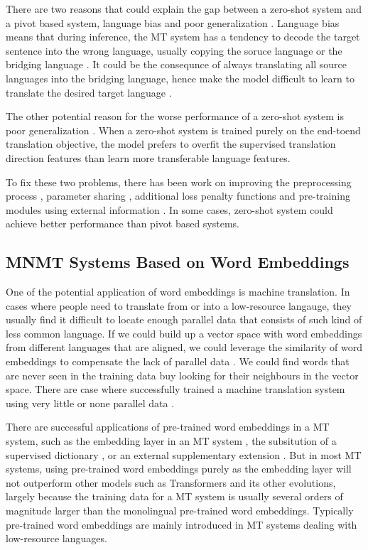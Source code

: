 \documentclass[thesis,fonts=libertine]{cluu}
\begin{document}
There are two reasons that could explain the gap between a zero-shot system and a pivot based system, language bias \parencite{Ha:2016aa,Ha:2017aa,Arivazhagan:2019aa} and poor generalization \parencite{Arivazhagan:2019aa}. Language bias means that during inference, the MT system has a tendency to decode the target sentence into the wrong language, usually copying the soruce language or the bridging language \cite{Ha:2016aa}. It could be the consequnce of always translating all source languages into the bridging language, hence make the model difficult to learn to translate the desired target language \parencite{Arivazhagan:2019aa}.

The other potential reason for the worse performance of a zero-shot system is poor generalization \parencite{Arivazhagan:2019aa}. When a zero-shot system is trained purely on the end-toend translation objective, the model prefers to overfit the supervised translation direction features than learn more transferable language features.

To fix these two problems, there has been work on improving the preprocessing process \parencite{Lakew:2018aa}, parameter sharing \parencite{Firat:2016aa, Blackwood:2018aa}, additional loss penalty functions \parencite{Arivazhagan:2019aa} and pre-training modules using external information \parencite{Baziotis:2020aa}. In some cases, zero-shot system could achieve better performance than pivot based systems.

\subsection{MNMT Systems Based on Word Embeddings}

One of the potential application of word embeddings is machine translation. In cases where people need to translate from or into a low-resource langauge, they usually find it difficult to locate enough parallel data that consists of such kind of less common language. If we could build up a vector space with word embeddings from different languages that are aligned, we could leverage the similarity of word embeddings to compensate the lack of parallel data \parencite{zou-etal-2013-bilingual}. We could find words that are never seen in the training data buy looking for their neighbours in the vector space. There are case where successfully trained a machine translation system using very little or none parallel data \parencite{Conneau:2017aa}.

There are successful applications of pre-trained word embeddings in a MT system, such as the embedding layer in an MT system \parencite{neishi-etal-2017-bag, Artetxe:2017aa}, the subsitution of a supervised dictionary \parencite{Conneau:2017aa}, or an external supplementary extension \cite{inproceedings}. But in most MT systems, using pre-trained word embeddings purely as the embedding layer will not outperform other models such as Transformers \parencite{Vaswani:2017aa} and its other evolutions, largely because the training data for a MT system is usually several orders of magnitude larger than the monolingual pre-trained word embeddings. Typically pre-trained word embeddings are mainly introduced in MT systems dealing with low-resource languages.
\end{document}
